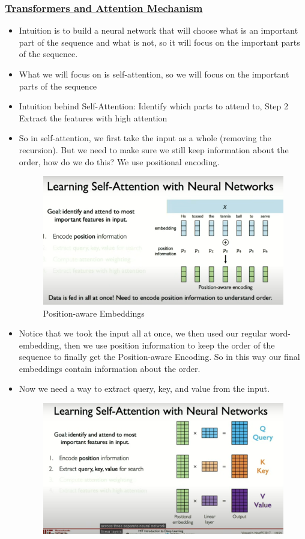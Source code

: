 \documentclass{article}
\begin{document}
  \subsubsection*{\underline{Transformers and Attention Mechanism}}
  \begin{itemize}
    \item Intuition is to build a neural network that will choose what is an important part of the sequence and what is not, so it will focus on the important parts of the sequence. 
    \item What we will focus on is self-attention, so we will focus on the important parts of the sequence
    \item Intuition behind Self-Attention: Identify which parts to attend to, Step 2 Extract the features with high attention 
    \item So in self-attention, we first take the input as a whole (removing the recursion). But we need to make sure we still keep information about the order, how do we do this? We use positional encoding. 
    \begin{figure}[H]
      \centering
      \includegraphics[width = \textwidth]{Images/pae.png}
      \caption{Position-aware Embeddings}
    \end{figure}
    \item Notice that we took the input all at once, we then used our regular word-embedding, then we use position information to keep the order of the sequence to finally get the Position-aware Encoding. So in this way our final embeddings contain information about the order.
    \item Now we need a way to extract query, key, and value from the input. 
    \begin{figure}
      \centering
      \includegraphics[width = \textwidth]{Images/qkv.png}

\end{figure}
\end{itemize}
\end{document}
